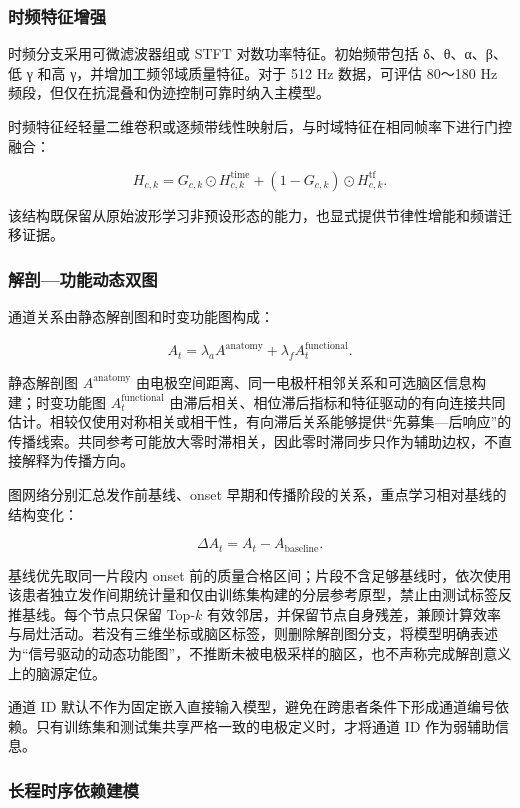 \documentclass{cumcmthesis}
\numberwithin{figure}{section} %
\numberwithin{table}{section} %
\begin{document}
\subsubsection{时频特征增强}

时频分支采用可微滤波器组或 STFT 对数功率特征。初始频带包括 δ、θ、α、β、低 γ 和高 γ，并增加工频邻域质量特征。对于 512 Hz 数据，可评估 80～180 Hz 频段，但仅在抗混叠和伪迹控制可靠时纳入主模型。

时频特征经轻量二维卷积或逐频带线性映射后，与时域特征在相同帧率下进行门控融合：

$$
H_{c,k}=
G_{c,k}\odot H^{\mathrm{time}}_{c,k}
+(1-G_{c,k})\odot H^{\mathrm{tf}}_{c,k}.
$$

该结构既保留从原始波形学习非预设形态的能力，也显式提供节律性增能和频谱迁移证据。

\subsubsection{解剖—功能动态双图}

通道关系由静态解剖图和时变功能图构成：

$$
A_t=\lambda_aA^{\mathrm{anatomy}}+\lambda_fA_t^{\mathrm{functional}}.
$$

静态解剖图 $A^{\mathrm{anatomy}}$ 由电极空间距离、同一电极杆相邻关系和可选脑区信息构建；时变功能图 $A_t^{\mathrm{functional}}$ 由滞后相关、相位滞后指标和特征驱动的有向连接共同估计。相较仅使用对称相关或相干性，有向滞后关系能够提供“先募集—后响应”的传播线索。共同参考可能放大零时滞相关，因此零时滞同步只作为辅助边权，不直接解释为传播方向。

图网络分别汇总发作前基线、onset 早期和传播阶段的关系，重点学习相对基线的结构变化：

$$
\Delta A_t=A_t-A_{\mathrm{baseline}}.
$$

基线优先取同一片段内 onset 前的质量合格区间；片段不含足够基线时，依次使用该患者独立发作间期统计量和仅由训练集构建的分层参考原型，禁止由测试标签反推基线。每个节点只保留 Top-$k$ 有效邻居，并保留节点自身残差，兼顾计算效率与局灶活动。若没有三维坐标或脑区标签，则删除解剖图分支，将模型明确表述为“信号驱动的动态功能图”，不推断未被电极采样的脑区，也不声称完成解剖意义上的脑源定位。

通道 ID 默认不作为固定嵌入直接输入模型，避免在跨患者条件下形成通道编号依赖。只有训练集和测试集共享严格一致的电极定义时，才将通道 ID 作为弱辅助信息。

\subsubsection{长程时序依赖建模}
\end{document}
